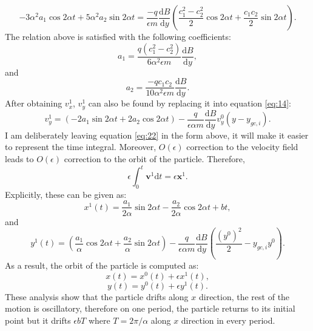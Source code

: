 \documentclass[11pt]{amsart}
\begin{document}
\begin{equation}
\label{eq:20}
-3 \alpha^2 a_1 \cos 2 \alpha t + 5 \alpha^2 a_2 \sin 2\alpha t=\frac{-q}{\epsilon m}\frac{\mathrm{d}B}{\mathrm{d}y}(\frac{c_{1}^2-c_{2}^{2}}{2}\cos 2 \alpha t+\frac{c_1 c_2}{2}\sin 2\alpha t).
\end{equation}
The relation above is satisfied with the following coefficients:
\begin{equation}
\label{eq:21}
a_1=\frac{q(c_{1}^2-c_{2}^{2})}{6 \alpha^2 \epsilon m}\frac{\mathrm{d}B}{\mathrm{d}y},
\end{equation}
and
\begin{equation}
\label{eq:21}
a_2=\frac{-q c_{1}c_{2}}{10 \alpha^2 \epsilon m}\frac{\mathrm{d}B}{\mathrm{d}y}.
\end{equation}
After obtaining $v_{x}^1$, $v_{y}^1$ can also be found by replacing it into equation \ref{eq:14}:
\begin{equation}
\label{eq:22}
 v_{y}^{1}=(-2a_1 \sin 2\alpha t+2a_2 \cos 2\alpha t)-\frac{q}{\epsilon \alpha m}\frac{\mathrm{d}B}{\mathrm{d}y}v_{y}^{0}(y-y_{gc,i}).
\end{equation}
I am deliberately leaving equation \ref{eq:22} in the form above, it will make it easier to represent the time integral. Moreover, $O(\epsilon)$ correction to the velocity field leads to $O(\epsilon)$ correction to the orbit of the particle. Therefore, 
\begin{equation}
\epsilon\int_{0}^{t}\mathbf{v}^1 \mathrm{d}t=\epsilon \mathbf{x}^1.
\end{equation}
Explicitly, these can be given as:
\begin{equation}
\label{eq:23}
x^1(t)=\frac{a_1}{2 \alpha}\sin 2\alpha t-\frac{a_2}{2 \alpha}\cos 2\alpha t + b t,
\end{equation}
and 
\begin{equation}
\label{eq:24}
 y^{1}(t)=(\frac{a_1}{\alpha} \cos 2\alpha t+\frac{a_2}{\alpha} \sin 2\alpha t)-\frac{q}{\epsilon \alpha m}\frac{\mathrm{d}B}{\mathrm{d}y}(\frac{(y^0)^2}{2}-y_{gc,i}y^0).
\end{equation}
As a result, the orbit of the particle is computed as:
\begin{equation}
\label{eq:25}
x(t)=x^0(t)+\epsilon x^1(t),
\end{equation}
\begin{equation}
\label{eq:26}
y(t)=y^0(t)+\epsilon y^1(t).
\end{equation}
These analysis show that the particle drifts along $x$ direction, the rest of the motion is oscillatory, therefore on one period, the particle returns to its initial point but it drifts $\epsilon b T$ where $T=2\pi/ \alpha$ along $x$ direction in every period. 
\end{document}
